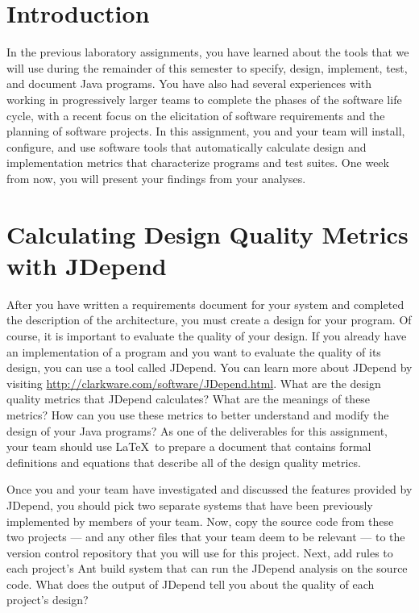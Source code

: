 

\usepackage[compact]{titlesec}



\section*{Introduction}

In the previous laboratory assignments, you have learned about the tools that we will use during the remainder of this
semester to specify, design, implement, test, and document Java programs.  You have also had several experiences with
working in progressively larger teams to complete the phases of the software life cycle, with a recent focus on the
elicitation of software requirements and the planning of software projects.  In this assignment, you and your team will
install, configure, and use software tools that automatically calculate design and implementation metrics that
characterize programs and test suites.  One week from now, you will present your findings from your analyses.  

\section*{Calculating Design Quality Metrics with JDepend}

After you have written a requirements document for your system and completed the description of the architecture, you
must create a design for your program.  Of course, it is important to evaluate the quality of your design.  If you
already have an implementation of a program and you want to evaluate the quality of its design, you can use a tool
called JDepend.  You can learn more about JDepend by visiting \url{http://clarkware.com/software/JDepend.html}. What are
the design quality metrics that JDepend calculates? What are the meanings of these metrics? How can you use these
metrics to better understand and modify the design of your Java programs? As one of the deliverables for this
assignment, your team should use \LaTeX\ to prepare a document that contains formal definitions and equations that
describe all of the design quality metrics. 

Once you and your team have investigated and discussed the features provided by JDepend, you should pick two separate
systems that have been previously implemented by members of your team. Now, copy the source code from these two projects
--- and any other files that your team deem to be relevant --- to the version control repository that you will use for this
project.  Next, add rules to each project's Ant build system that can run the JDepend analysis on the source code. What
does the output of JDepend tell you about the quality of each project's design?

